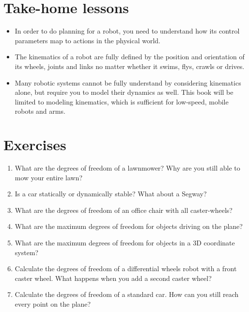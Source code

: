 \section*{Take-home lessons}

\begin{itemize}
\item In order to do planning for a robot, you need to understand how its control parameters map to actions in the physical world.
\item The kinematics of a robot are fully defined by the position and orientation of its wheels, joints and links no matter whether it swims, flys, crawls or drives.
\item Many robotic systems cannot be fully understand by considering kinematics alone, but require you to model their dynamics as well. This book will be limited to modeling kinematics, which is sufficient for low-speed, mobile robots and arms.
\end{itemize} 


\section*{Exercises}\small
\begin{enumerate}
\item What are the degrees of freedom of a lawnmower? Why are you still able to mow your entire lawn?
\item Is a car statically or dynamically stable? What about a Segway?
\item What are the degrees of freedom of an office chair with all caster-wheels?
\item What are the maximum degrees of freedom for objects driving on the plane?
\item What are the maximum degrees of freedom for objects in a 3D coordinate system?
\item Calculate the degrees of freedom of a differential wheels robot with a front caster wheel. What happens when you add a second caster wheel?
\item Calculate the degrees of freedom of a standard car. How can you still reach every point on the plane?
\end{enumerate}\normalsize